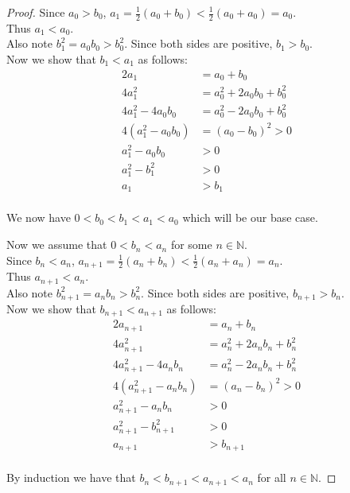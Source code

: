 \documentclass[12pt]{article}
\begin{document}
	\begin{proof}
		Since $a_{0} > b_{0}$, $a_{1} = \frac{1}{2} (a_{0}+b_{0}) < \frac{1}{2} (a_{0}+a_{0}) = a_{0}$. \\
		Thus $a_{1} < a_{0}$. \\
		Also note $b_{1}^{2} = a_{0}b_{0} > b_{0}^{2}$. Since both sides are positive, $b_{1} > b_{0}$. \\
		Now we show that $b_1<a_1$ as follows:\\
		\begin{align*}
			2a_1 & = a_0 + b_0 \\
			4a_1^2 & = a_0^2 + 2a_0b_0 + b_0^2 \\
			4a_1^2 - 4a_0b_0 & = a_0^2 - 2a_0b_0 + b_0^2 \\
			4(a_1^2 - a_0b_0) & = (a_0 - b_0)^2 > 0\\
			a_1^2 - a_0b_0 & > 0 \\
			a_1^2 - b_1^2 & > 0\\
			a_1 & > b_1\\
		\end{align*}
				
		We now have $0 < b_{0}< b_1 <a_{1} < a_{0}$ which will be our base case. \bigbreak
		
		Now we assume that $0< b_n <a_{n}$ for some $n \in \mathbb{N}$.\\
		Since $b_n < a_n$, $a_{n+1} = \frac{1}{2} (a_{n}+b_{n}) < \frac{1}{2} (a_{n}+a_{n}) = a_{n}$. \\
		Thus $a_{n+1} < a_{n}$. \\
		Also note $b_{n+1}^{2} = a_{n}b_{n} > b_{n}^{2}$. Since both sides are positive, $b_{n+1} > b_{n}$. \\
		Now we show that $b_{n+1}<a_{n+1}$ as follows:\\
		\begin{align*}
		2a_{n+1} & = a_n + b_n \\
		4a_{n+1}^2 & = a_n^2 + 2a_nb_n + b_n^2 \\
		4a_{n+1}^2 - 4a_nb_n & = a_n^2 - 2a_nb_n + b_n^2 \\
		4(a_{n+1}^2 - a_nb_n) & = (a_n - b_n)^2 > 0\\
		a_{n+1}^2 - a_nb_n & > 0 \\
		a_{n+1}^2 - b_{n+1}^2 & > 0\\
		a_{n+1} & > b_{n+1}\\
		\end{align*}
		
		\bigbreak
		
		By induction we have that $b_{n}<b_{n+1}<a_{n+1} < a_{n}$ for all $n \in \mathbb{N}$. \bigbreak
		

\end{proof}
\end{document}
